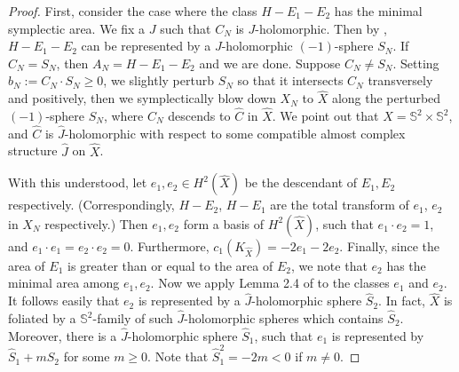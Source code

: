\documentclass[11pt]{amsart}
\theoremstyle{plain}
\numberwithin{theorem}{section}
\theoremstyle{definition}
\newcommand{\s}{{\mathbb S}}
\begin{document}
\begin{proof}
First, consider the case where the class $H-E_1-E_2$ has the minimal symplectic area. We fix a $J$ such that $C_N$ is $J$-holomorphic. Then by \cite{KK}, $H-E_1-E_2$ can be represented by a $J$-holomorphic $(-1)$-sphere $S_N$. If $C_N=S_N$, then $A_N=H-E_1-E_2$ and we are done. Suppose $C_N\neq S_N$. Setting $b_N:=C_N\cdot S_N\geq 0$, we slightly perturb $S_N$ so that it intersects $C_N$
transversely and positively, then we symplectically blow down $X_N$ to $\hat{X}$ along the 
perturbed $(-1)$-sphere $S_N$, where $C_N$ descends to $\hat{C}$ in $\hat{X}$. We point out 
that $\hat{X}=\s^2\times \s^2$, and $\hat{C}$ is $\hat{J}$-holomorphic with respect to some compatible almost complex structure $\hat{J}$ on $\hat{X}$. 

With this understood, let $e_1, e_2\in H^2(\hat{X})$ be the descendant of $E_1,E_2$ respectively. 
(Correspondingly, $H-E_2$, $H-E_1$ are the total transform of $e_1$, $e_2$ in $X_N$ respectively.)
Then $e_1,e_2$ form a basis of $H^2(\hat{X})$, such that $e_1\cdot e_2=1$, and $e_1\cdot e_1=e_2\cdot e_2=0$. Furthermore, $c_1(K_{\hat{X}})=-2e_1-2e_2$. Finally, since the area of $E_1$ is greater than or equal to the area of $E_2$, we note that $e_2$ has the minimal area among 
$e_1, e_2$.
Now we apply Lemma 2.4 of \cite{C2} to the classes $e_1$ and $e_2$. It follows easily that $e_2$ is represented by a $\hat{J}$-holomorphic sphere $\hat{S}_2$. In fact, $\hat{X}$ is foliated by a $\s^2$-family of such $\hat{J}$-holomorphic spheres which contains $\hat{S}_2$. 
Moreover, there is a $\hat{J}$-holomorphic sphere 
$\hat{S}_1$, such that $e_1$ is represented by $\hat{S}_1+m \hat{S}_2$ for some $m\geq 0$. 
Note that $\hat{S}_1^2=-2m<0$ if $m\neq 0$. 


\end{proof}
\end{document}
